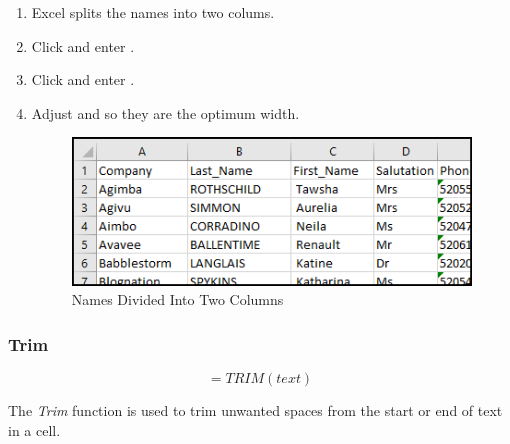 \begin{enumerate}
	\item Excel splits the names into two colums. 
	\item Click  and enter .
	\item Click  and enter .
	\item Adjust  and  so they are the optimum width.
	
	\begin{figure}[H]
		\centering
		\includegraphics[width=\maxwidth{.95\linewidth}]{gfx/ch09_fig33}
		\caption{Names Divided Into Two Columns}
		\label{09:fig33}
	\end{figure}
\end{enumerate}

\subsubsection{Trim}

\[ =TRIM(text) \]

The \textit{Trim} function is used to trim unwanted spaces from the start or end of text in a cell.

